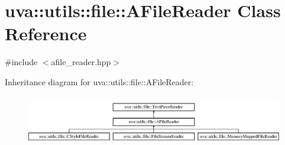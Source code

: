 \hypertarget{classuva_1_1utils_1_1file_1_1_a_file_reader}{}\section{uva\+:\+:utils\+:\+:file\+:\+:A\+File\+Reader Class Reference}
\label{classuva_1_1utils_1_1file_1_1_a_file_reader}


{\ttfamily \#include $<$afile\+\_\+reader.\+hpp$>$}

Inheritance diagram for uva\+:\+:utils\+:\+:file\+:\+:A\+File\+Reader\+:\begin{figure}[H]
\begin{center}
\leavevmode
\includegraphics[height=2.222222cm]{classuva_1_1utils_1_1file_1_1_a_file_reader}
\end{center}
\end{figure}
